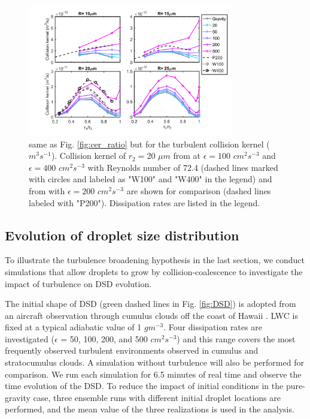 \begin{figure}[ht]
\centering
\includegraphics[width=0.8\textwidth]{Figures/Chap3/tCK.png}
\caption{same as Fig. \ref{fig:cer_ratio} but for the turbulent collision kernel ($m^3s^{-1}$). Collision kernel of $r_2 = 20$ $\mu m$ from \citet{Wang2008} at $\epsilon=100$ $cm^2s^{-3}$ and $\epsilon=400$ $cm^2s^{-3}$ with Reynolds number of 72.4 (dashed lines marked with circles and labeled as "W100" and "W400" in the legend) and from \citet{Pinsky2008} with $\epsilon=200$ $cm^2s^{-3}$ are shown for comparison (dashed lines labeled with "P200"). Dissipation rates are listed in the legend.} \label{fig:tck}
\end{figure}

\subsection{Evolution of droplet size distribution} \label{sec:ch3_reDSD}

To illustrate the turbulence broadening hypothesis in the last section, we conduct simulations that allow droplets to grow by collision-coalescence to investigate the impact of turbulence on DSD evolution. 

The initial shape of DSD (green dashed lines in Fig. \ref{fig:DSD}) is adopted from an aircraft observation through cumulus clouds off the coast of Hawaii \citep{Raga1990}. LWC is fixed at a typical adiabatic value of 1 $gm^{-3}$. Four dissipation rates are investigated ($\epsilon$ = 50, 100, 200, and 500 $cm^2s^{-3}$) and this range covers the most frequently observed turbulent environments observed in cumulus and stratocumulus clouds. A simulation without turbulence will also be performed for comparison. We run each simulation for 6.5 minutes of real time and observe the time evolution of the DSD. To reduce the impact of initial conditions in the pure-gravity case, three ensemble runs with different initial droplet locations are performed, and the mean value of the three realizations is used in the analysis.

